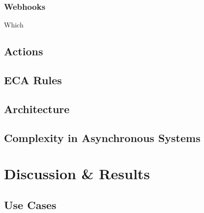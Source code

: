 \documentclass[11pt]{article}%
\begin{document}
\subsubsection{Webhooks}
Which 



\subsection{Actions}



\subsection{ECA Rules}



\subsection{Architecture}



\subsection{Complexity in Asynchronous Systems}
%





\section{Discussion \& Results}



\subsection{Use Cases}
%

\newpage
\end{document}
